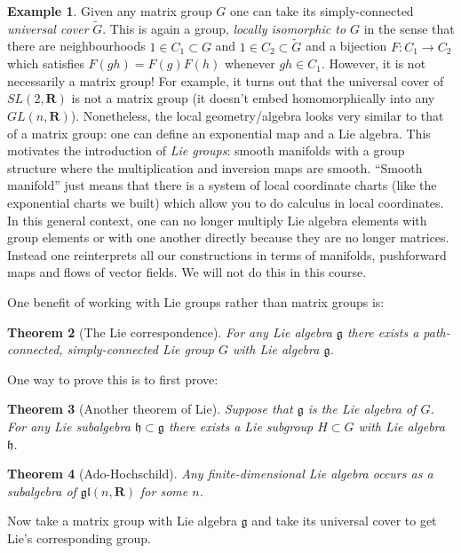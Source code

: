 \documentclass[12pt]{article}
\newcommand{\RR}{\mathbf{R}}
\newtheorem{thm}{Theorem}[section]
\theoremstyle{definition}
\newtheorem{exm}[thm]{Example}
\theoremstyle{check}
\theoremstyle{remark}
\theoremstyle{TheoremNum}
\begin{document}
\begin{exm}
Given any matrix group $G$ one can take its simply-connected {\em universal cover} $\tilde{G}$. This is again a group, {\em locally isomorphic to $G$} in the sense that there are neighbourhoods $1\in C_1\subset G$ and $1\in C_2\subset\tilde{G}$ and a bijection $F\colon C_1\to C_2$ which satisfies $F(gh)=F(g)F(h)$ whenever $gh\in C_1$. However, it is not necessarily a matrix group! For example, it turns out that the universal cover of $SL(2,\RR)$ is not a matrix group (it doesn't embed homomorphically into any $GL(n,\RR)$). Nonetheless, the local geometry/algebra looks very similar to that of a matrix group: one can define an exponential map and a Lie algebra. This motivates the introduction of {\em Lie groups}: smooth manifolds with a group structure where the multiplication and inversion maps are smooth. ``Smooth manifold'' just means that there is a system of local coordinate charts (like the exponential charts we built) which allow you to do calculus in local coordinates. In this general context, one can no longer multiply Lie algebra elements with group elements or with one another directly because they are no longer matrices. Instead one reinterprets all our constructions in terms of manifolds, pushforward maps and flows of vector fields. We will not do this in this course.
\end{exm}

One benefit of working with Lie groups rather than matrix groups is:

\begin{thm}[The Lie correspondence]
For any Lie algebra $\mathfrak{g}$ there exists a path-connected, simply-connected Lie group $G$ with Lie algebra $\mathfrak{g}$.
\end{thm}

One way to prove this is to first prove:
\begin{thm}[Another theorem of Lie]
Suppose that $\mathfrak{g}$ is the Lie algebra of $G$. For any Lie subalgebra $\mathfrak{h}\subset\mathfrak{g}$ there exists a Lie subgroup $H\subset G$ with Lie algebra $\mathfrak{h}$.
\end{thm}
\begin{thm}[Ado-Hochschild]
Any finite-dimensional Lie algebra occurs as a subalgebra of $\mathfrak{gl}(n,\RR)$ for some $n$.
\end{thm}

Now take a matrix group with Lie algebra $\mathfrak{g}$ and take its universal cover to get Lie's corresponding group.
\end{document}
